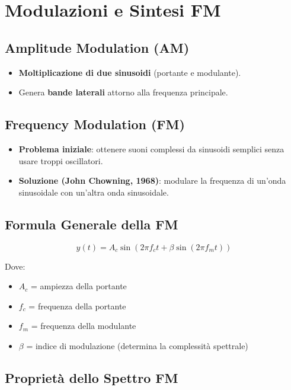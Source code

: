 \section{Modulazioni e Sintesi FM}

\subsection*{Amplitude Modulation (AM)}

\begin{itemize}
    \item \textbf{Moltiplicazione di due sinusoidi} (portante e modulante).
    \item Genera \textbf{bande laterali} attorno alla frequenza principale.
\end{itemize}

\subsection*{Frequency Modulation (FM)}

\begin{itemize}
    \item \textbf{Problema iniziale}: ottenere suoni complessi da sinusoidi semplici senza usare troppi oscillatori.
    \item \textbf{Soluzione (John Chowning, 1968)}: modulare la frequenza di un’onda sinusoidale con un'altra onda sinusoidale.
\end{itemize}

\subsection*{Formula Generale della FM}

\[
y(t)= A_c \sin(2\pi f_c t + \beta \sin(2\pi f_m t))
\]

Dove:

\begin{itemize}
    \item \( A_c \) = ampiezza della portante
    \item \( f_c \) = frequenza della portante
    \item \( f_m \) = frequenza della modulante
    \item \( \beta \) = indice di modulazione (determina la complessità spettrale)
\end{itemize}

\subsection*{Proprietà dello Spettro FM}


